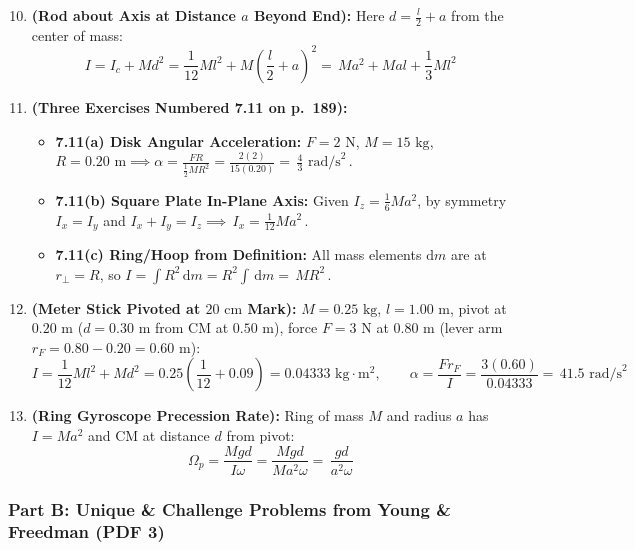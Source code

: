 \documentclass[11pt,a4paper,openany,oneside]{book}
\newcommand{\eqbox}[1]{\boxed{\,#1\,}}
\newcommand{\dd}{\,\mathrm{d}}
\newcommand{\diff}{\mathrm{d}}
\numberwithin{equation}{chapter}
\begin{document}
\begin{enumerate}[label=\textbf{Ex.\ 7.\arabic*},leftmargin=3.5em]
  \setcounter{enumi}{9}
  \item \textbf{(Rod about Axis at Distance $a$ Beyond End):} Here $d = \frac{l}{2} + a$ from the center of mass:
  \begin{equation*}
    I = I_c + Md^2 = \frac{1}{12}Ml^2 + M\!\left(\frac{l}{2} + a\right)^2 = \eqbox{Ma^2 + Mal + \frac{1}{3}Ml^2}
  \end{equation*}

  \item \textbf{(Three Exercises Numbered 7.11 on p.\ 189):}
  \begin{itemize}
    \item \textbf{7.11(a) Disk Angular Acceleration:} $F = 2\text{ N}$, $M = 15\text{ kg}$, $R = 0.20\text{ m} \implies \alpha = \frac{FR}{\frac{1}{2}MR^2} = \frac{2(2)}{15(0.20)} = \eqbox{\frac{4}{3}\text{ rad/s}^2}$.
    \item \textbf{7.11(b) Square Plate In-Plane Axis:} Given $I_z = \frac{1}{6}Ma^2$, by symmetry $I_x = I_y$ and $I_x + I_y = I_z \implies \eqbox{I_x = \frac{1}{12}Ma^2}$.
    \item \textbf{7.11(c) Ring/Hoop from Definition:} All mass elements $\diff m$ are at $r_\perp = R$, so $I = \int R^2\dd m = R^2\int\dd m = \eqbox{MR^2}$.
  \end{itemize}

  \setcounter{enumi}{13}
  \item \textbf{(Meter Stick Pivoted at $20\text{ cm}$ Mark):} $M = 0.25\text{ kg}$, $l = 1.00\text{ m}$, pivot at $0.20\text{ m}$ ($d = 0.30\text{ m}$ from CM at $0.50\text{ m}$), force $F = 3\text{ N}$ at $0.80\text{ m}$ (lever arm $r_F = 0.80 - 0.20 = 0.60\text{ m}$):
  \begin{equation*}
    I = \frac{1}{12}Ml^2 + Md^2 = 0.25\!\left(\frac{1}{12} + 0.09\right) = 0.04333\text{ kg}\cdot\text{m}^2, \qquad \alpha = \frac{F r_F}{I} = \frac{3(0.60)}{0.04333} = \eqbox{41.5\text{ rad/s}^2}
  \end{equation*}

  \item \textbf{(Ring Gyroscope Precession Rate):} Ring of mass $M$ and radius $a$ has $I = Ma^2$ and CM at distance $d$ from pivot:
  \begin{equation*}
    \Omega_p = \frac{Mgd}{I\omega} = \frac{Mgd}{Ma^2\omega} = \eqbox{\frac{gd}{a^2\omega}}
  \end{equation*}
\end{enumerate}

\subsubsection{Part B: Unique \& Challenge Problems from Young \& Freedman (PDF 3)}
\end{document}
